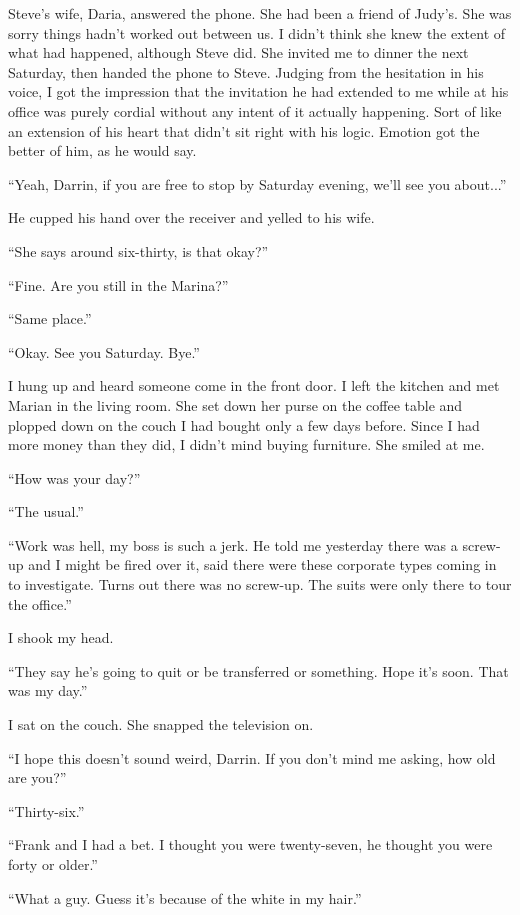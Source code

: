 \documentclass[
]{article}
\begin{document}
Steve's wife, Daria, answered the phone. She had been a friend of
Judy's. She was sorry things hadn't worked out between us. I didn't
think she knew the extent of what had happened, although Steve did. She
invited me to dinner the next Saturday, then handed the phone to Steve.
Judging from the hesitation in his voice, I got the impression that the
invitation he had extended to me while at his office was purely cordial
without any intent of it actually happening. Sort of like an extension
of his heart that didn't sit right with his logic. Emotion got the
better of him, as he would say.

``Yeah, Darrin, if you are free to stop by Saturday evening, we'll see
you about...''

He cupped his hand over the receiver and yelled to his wife.

``She says around six-thirty, is that okay?''

``Fine. Are you still in the Marina?''

``Same place.''

``Okay. See you Saturday. Bye.''

I hung up and heard someone come in the front door. I left the kitchen
and met Marian in the living room. She set down her purse on the coffee
table and plopped down on the couch I had bought only a few days before.
Since I had more money than they did, I didn't mind buying furniture.
She smiled at me.

``How was your day?''

``The usual.''

``Work was hell, my boss is such a jerk. He told me yesterday there was
a screw-up and I might be fired over it, said there were these corporate
types coming in to investigate. Turns out there was no screw-up. The
suits were only there to tour the office.''

I shook my head.

``They say he's going to quit or be transferred or something. Hope it's
soon. That was my day.''

I sat on the couch. She snapped the television on.

``I hope this doesn't sound weird, Darrin. If you don't mind me asking,
how old are you?''

``Thirty-six.''

``Frank and I had a bet. I thought you were twenty-seven, he thought you
were forty or older.''

``What a guy. Guess it's because of the white in my hair.''
\end{document}
